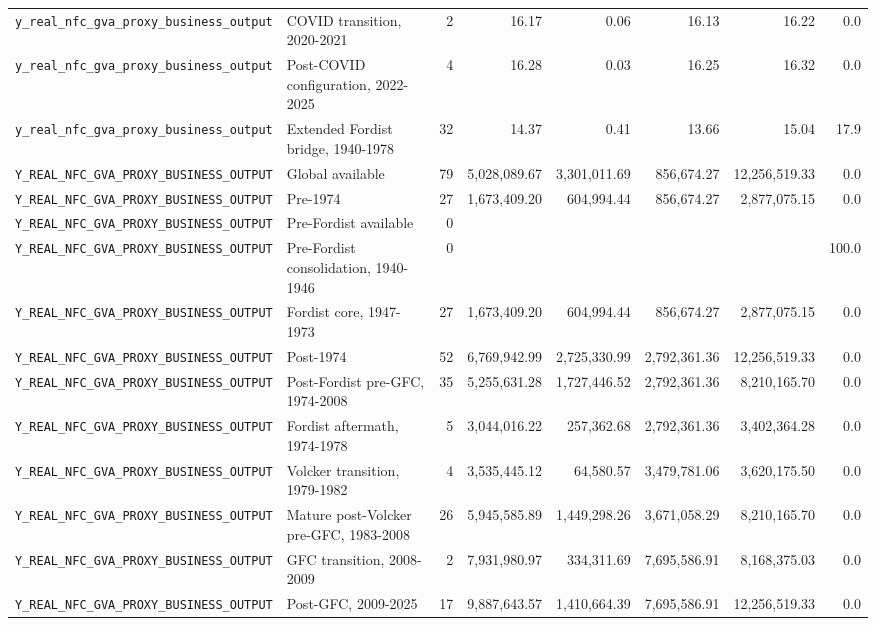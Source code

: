 \begin{landscape}
\begin{longtable}{p{4.4cm}p{3.8cm}rrrrrr}
\\
\nolinkurl{y_real_nfc_gva_proxy_business_output} & COVID transition, 2020-2021 & 2 & 16.17 & 0.06 & 16.13 & 16.22 & 0.0
\\
\nolinkurl{y_real_nfc_gva_proxy_business_output} & Post-COVID configuration, 2022-2025 & 4 & 16.28 & 0.03 & 16.25 & 16.32 & 0.0
\\
\nolinkurl{y_real_nfc_gva_proxy_business_output} & Extended Fordist bridge, 1940-1978 & 32 & 14.37 & 0.41 & 13.66 & 15.04 & 17.9
\\
\nolinkurl{Y_REAL_NFC_GVA_PROXY_BUSINESS_OUTPUT} & Global available & 79 & 5,028,089.67 & 3,301,011.69 & 856,674.27 & 12,256,519.33 & 0.0
\\
\nolinkurl{Y_REAL_NFC_GVA_PROXY_BUSINESS_OUTPUT} & Pre-1974 & 27 & 1,673,409.20 & 604,994.44 & 856,674.27 & 2,877,075.15 & 0.0
\\
\nolinkurl{Y_REAL_NFC_GVA_PROXY_BUSINESS_OUTPUT} & Pre-Fordist available & 0 &  &  &  &  &
\\
\nolinkurl{Y_REAL_NFC_GVA_PROXY_BUSINESS_OUTPUT} & Pre-Fordist consolidation, 1940-1946 & 0 &  &  &  &  & 100.0
\\
\nolinkurl{Y_REAL_NFC_GVA_PROXY_BUSINESS_OUTPUT} & Fordist core, 1947-1973 & 27 & 1,673,409.20 & 604,994.44 & 856,674.27 & 2,877,075.15 & 0.0
\\
\nolinkurl{Y_REAL_NFC_GVA_PROXY_BUSINESS_OUTPUT} & Post-1974 & 52 & 6,769,942.99 & 2,725,330.99 & 2,792,361.36 & 12,256,519.33 & 0.0
\\
\nolinkurl{Y_REAL_NFC_GVA_PROXY_BUSINESS_OUTPUT} & Post-Fordist pre-GFC, 1974-2008 & 35 & 5,255,631.28 & 1,727,446.52 & 2,792,361.36 & 8,210,165.70 & 0.0
\\
\nolinkurl{Y_REAL_NFC_GVA_PROXY_BUSINESS_OUTPUT} & Fordist aftermath, 1974-1978 & 5 & 3,044,016.22 & 257,362.68 & 2,792,361.36 & 3,402,364.28 & 0.0
\\
\nolinkurl{Y_REAL_NFC_GVA_PROXY_BUSINESS_OUTPUT} & Volcker transition, 1979-1982 & 4 & 3,535,445.12 & 64,580.57 & 3,479,781.06 & 3,620,175.50 & 0.0
\\
\nolinkurl{Y_REAL_NFC_GVA_PROXY_BUSINESS_OUTPUT} & Mature post-Volcker pre-GFC, 1983-2008 & 26 & 5,945,585.89 & 1,449,298.26 & 3,671,058.29 & 8,210,165.70 & 0.0
\\
\nolinkurl{Y_REAL_NFC_GVA_PROXY_BUSINESS_OUTPUT} & GFC transition, 2008-2009 & 2 & 7,931,980.97 & 334,311.69 & 7,695,586.91 & 8,168,375.03 & 0.0
\\
\nolinkurl{Y_REAL_NFC_GVA_PROXY_BUSINESS_OUTPUT} & Post-GFC, 2009-2025 & 17 & 9,887,643.57 & 1,410,664.39 & 7,695,586.91 & 12,256,519.33 & 0.0

\end{longtable}
\end{landscape}
